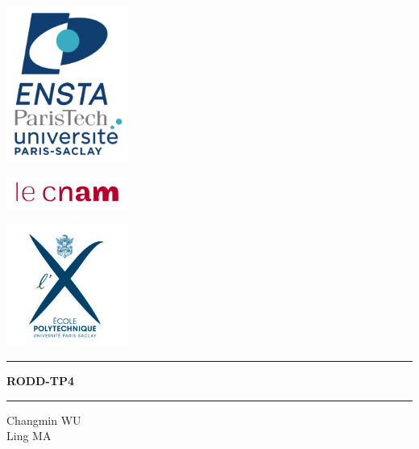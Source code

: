 \documentclass[12pt,a4paper]{article}
\begin{document}
\setcounter{page}{0}


\begin{center}

\begin{minipage}[l]{.2\linewidth}
	\flushleft\includegraphics[width=4cm]{img/logo_ENSTA.png}
\end{minipage}
\begin{minipage}[r]{.35\linewidth}
	\flushright\includegraphics[width=4cm]{img/logo_CNAM.png}
\end{minipage}
\begin{minipage}[r]{.3\linewidth}
	\flushright\includegraphics[width=4cm]{img/logo_X.jpg}
\end{minipage}
\vspace{1.5cm}

\hrule \vspace{0.5cm}
\begin{LARGE}
	\textbf{RODD-TP4}\\
\end{LARGE}
\vspace{0.5cm} \hrule
\vspace{3cm}

\begin{Large}\color{carmine}
	Changmin WU\\
	Ling MA\\
\end{Large}
\vspace{5cm}


\end{center}
\end{document}
